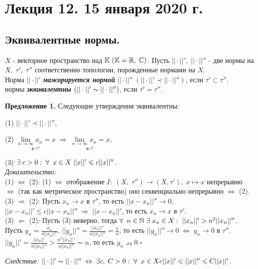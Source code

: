 \documentclass[../../main.tex]{subfiles}
\begin{document}
\section{Лекция 12. 15 января 2020 г.}

\subsection{Эквивалентные нормы.}

$X$ - векторное пространство над $\mathbb{K}\; (\mathbb{K} = \mathbb{R},\; \mathbb{C})$. Пусть $||\cdot||',\;||\cdot||''$ - две нормы на $X,\; \tau',\;\tau''$ соответственно топологии, порожденные нормами на $X$.\\
 Норма $||\cdot||'$ \textbf{\textit{мажорируется нормой}} $||\cdot||''\; (||\cdot||'\prec||\cdot||'')$, если $\tau' \subset \tau''$.\\
 нормы \textbf{\textit{эквивалентны}} $(||\cdot||'\thicksim||\cdot||'')$, если $\tau' = \tau''$.

\textbf{Предложение 1.} Следующие утверждения эквивалентны:

(1) $||\cdot||'\prec ||\cdot||''$,

(2) $\underset{\text{в }\tau''}{\lim\limits_{n\rightarrow \infty} x_n = x}\; \Rightarrow\; \underset{\text{в }\tau'}{\lim\limits_{n\rightarrow\infty} x_n = x}$,

(3) $\exists\; c > 0:\; \forall\:\; x\in X \; ||x||'\leqslant c||x||''$.\\
\textit{Доказательство:}\\
(1) $\Leftrightarrow$ (2): (1) $\Leftrightarrow$ отображение $I:\; (X,\;\tau'')\rightarrow (X,\tau'),\; x\mapsto x$ непрерывно $\Leftrightarrow$ (так как метрическое пространство) оно секвенциально непрерывно $\Leftrightarrow$ (2).\\
(3) $\Rightarrow$ (2): Пусть $x_n \rightarrow x$ в $\tau''$, то есть $||x - x_n||'' \rightarrow 0$, $||x - x_n||'\leq c||x - x_n||''\;\Rightarrow\; ||x - x_n||'$, то есть $x_n\rightarrow x$ в $\tau'$.\\
(3) $\Leftarrow$ (2): Пусть (3) неверно, тогда $\forall\:\; n\in \mathbb{N}\;\exists\; x_n\in X:\; ||x_n||'>n^2||x_n||''$. Пусть $y_n = \frac{x_n}{n||x_n||''}$, $||y_n||''=\frac{||x_n||''}{n||x_n||''} = \frac 1n$, то есть $||y_n||''\rightarrow 0 \;\Leftrightarrow\; y_n\rightarrow 0$ в $\tau''$. $||y_n||' = \frac{||x_n||'}{n||x_n||''}>\frac{n^2||x_n||''}{n||x_n||''} = n$, то есть $y_n\nrightarrow 0$ $\square$

\textit{Следствие:} $||\cdot||'\thicksim||\cdot||''\; \Leftrightarrow\; \exists c,\;C>0:\;\forall\:\; x\in X c||x||'\leqslant ||x||''\leqslant C||x||'$.
\end{document}
